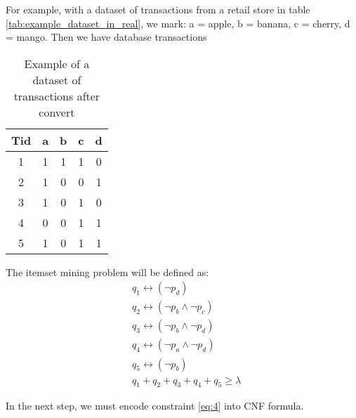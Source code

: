For example, with a dataset of transactions from a retail store in table \ref{tab:example_dataset_in_real}, we mark:
a = apple, b = banana, c = cherry, d = mango. Then we have database transactions

\begin{table}[H]
    \centering
    \caption{Example of a dataset of transactions after convert}
    \label{tab:example_dataset_after_convert}
    \begin{tabular}{|c| c c c c |}
        \hline
        \textbf{Tid} & \textbf{a} & \textbf{b} & \textbf{c} & \textbf{d} \\
        \hline
        1            & 1          & 1          & 1          & 0          \\
        2            & 1          & 0          & 0          & 1          \\
        3            & 1          & 0          & 1          & 0          \\
        4            & 0          & 0          & 1          & 1          \\
        5            & 1          & 0          & 1          & 1          \\
        \hline
    \end{tabular}
\end{table}

The itemset mining problem will be defined as:
\begin{equation*}
    \begin{aligned}
         & q_1 \leftrightarrow (\neg p_d                ) \\
         & q_2 \leftrightarrow (\neg p_b \wedge \neg p_c) \\
         & q_3 \leftrightarrow (\neg p_b \wedge \neg p_d) \\
         & q_4 \leftrightarrow (\neg p_a \wedge \neg p_d) \\
         & q_5 \leftrightarrow (\neg p_b                ) \\
         & q_1 + q_2 + q_3 + q_4 + q_5 \geq \lambda
    \end{aligned}
\end{equation*}

In the next step, we must encode constraint \ref{eq:4} into CNF formula.
